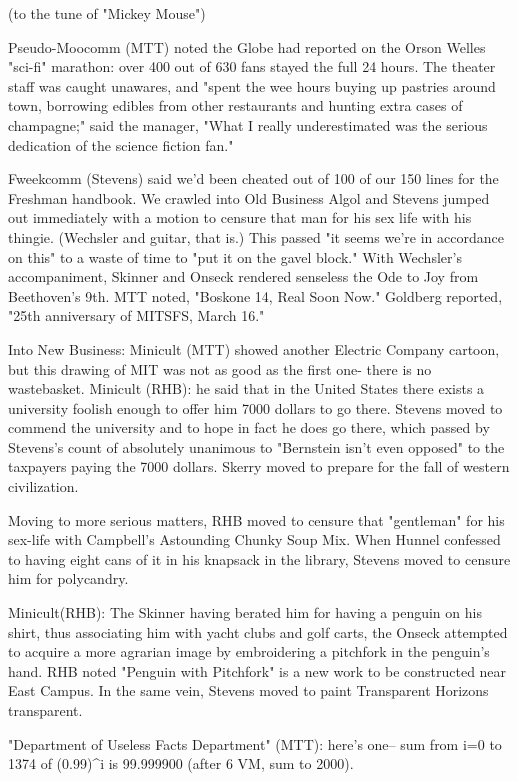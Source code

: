 \documentclass[12pt]{article}
\begin{document}
(to the tune of "Mickey Mouse")

Pseudo-Moocomm (MTT) noted the Globe had reported on the Orson Welles "sci-fi" marathon: over 400 out of 630 fans stayed the full 24 hours. The theater staff was caught unawares, and "spent the wee hours buying up pastries around town, borrowing edibles from other restaurants and hunting extra cases of champagne;" said the manager, "What I really underestimated was the serious dedication of the science fiction fan."

Fweekcomm (Stevens) said we'd been cheated out of 100 of our 150 lines for the Freshman handbook. We crawled into Old Business Algol and Stevens jumped out immediately with a motion to censure that man for his sex life with his thingie. (Wechsler and guitar, that is.) This passed "it seems we're in accordance on this" to a waste of time to "put it on the gavel block." With Wechsler's accompaniment, Skinner and Onseck rendered senseless the Ode to Joy from Beethoven's 9th. MTT noted, "Boskone 14, Real Soon Now." Goldberg reported, "25th anniversary of MITSFS, March 16."

Into New Business: Minicult (MTT) showed another Electric Company cartoon, but this drawing of MIT was not as good as the first one- there is no wastebasket. Minicult (RHB): he said that in the United States there exists a university foolish enough to offer him 7000 dollars to go there. Stevens moved to commend the university and to hope in fact he does go there, which passed by Stevens's count of absolutely unanimous to "Bernstein isn't even opposed" to the taxpayers paying the 7000 dollars. Skerry moved to prepare for the fall of western civilization.

Moving to more serious matters, RHB moved to censure that "gentleman" for his sex-life with Campbell's Astounding Chunky Soup Mix. When Hunnel confessed to having eight cans of it in his knapsack in the library, Stevens moved to censure him for polycandry.

Minicult(RHB): The Skinner having berated him for having a penguin on his shirt, thus associating him with yacht clubs and golf carts, the Onseck attempted to acquire a more agrarian image by embroidering a pitchfork in the penguin's hand. RHB noted "Penguin with Pitchfork" is a new work to be constructed near East Campus. In the same vein, Stevens moved to paint Transparent Horizons transparent.

"Department of Useless Facts Department" (MTT): here's one--
sum from i=0 to 1374 of (0.99)^i is 99.999900 (after 6 VM, sum to 2000).
\end{document}
